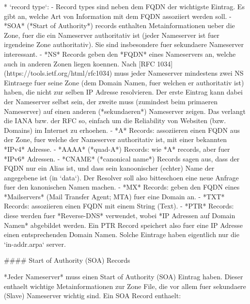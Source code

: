 * `record type`:
  - Record types sind neben dem FQDN der wichtigste Eintrag. Es gibt an, welche
    Art von Information mit dem FQDN assoziiert werden soll.
  - *SOA* (*Start of Authority*) records enthalten Metainformationen ueber die
	Zone, fuer die ein Nameserver authoritativ ist (jeder Nameserver ist fuer
	irgendeine Zone authoritativ). Sie sind insbesondere fuer sekundaere
	Nameserver interessant.
  - *NS* Records geben den *FQDN* eines Nameservers an, welche auch in anderen
	Zonen liegen koennen. Nach [RFC 1034](https://tools.ietf.org/html/rfc1034)
	muss jeder Nameserver mindestens zwei NS Eintraege fuer seine Zone (dem
	Domain Namen, fuer welchen er authoritativ ist) haben, die nicht zur selben
	IP Adresse resolvieren. Der erste Eintrag kann dabei der Nameserver selbst
	sein, der zweite muss (zumindest beim primaeren Nameserver) auf einen
	anderen (*sekundaeren*) Nameserver zeigen. Das verlangt die IANA bzw. der
	RFC so, einfach um die Reliability von Websiten (bzw. Domains) im Internet
	zu erhoehen.
  - *A* Records: assoziieren einen FQDN aus der Zone, fuer welche der Nameserver
	authoritativ ist, mit einer bekannten *IPv4* Adresse.
  - *AAAA* (*quad-A*) Records: wie *A* records, aber fuer *IPv6* Adressen.
  - *CNAME* (*canonical name*) Records sagen aus, dass der FQDN nur ein Alias
    ist, und dass sein kanoonischer (echter) Name der angegebene ist (in
    `data`). Der Resolver soll also bitteschoen eine neue Anfrage fuer den
    kanonischen Namen machen.
  - *MX* Records: geben den FQDN eines *Mailservers* (Mail Transfer Agent; MTA)
    fuer eine Domain an.
  - *TXT* Records: assoziieren einen FQDN mit einem String (Text).
  - *PTR* Records: diese werden fuer *Reverse-DNS* verwendet, wobei *IP Adressen
    auf Domain Namen* abgebildet werden. Ein PTR Record speichert also fuer eine
    IP Adresse einen entsprechenden Domain Namen. Solche Eintrage haben
    eigentlich nur die `in-addr.arpa` server.

#### Start of Authority (SOA) Records

*Jeder Nameserver* muss einen Start of Authority (SOA) Eintrag haben. Dieser
enthaelt wichtige Metainformationen zur Zone File, die vor allem fuer sekundaere
(Slave) Nameserver wichtig sind. Ein SOA Record enthaelt:

